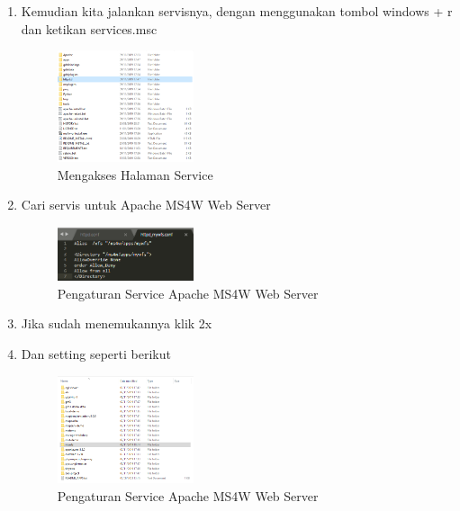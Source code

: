 \begin{enumerate}
  \item Kemudian kita jalankan servisnya, dengan menggunakan tombol windows + r dan ketikan services.msc
  \hfill\break
    \begin{figure}[H]
		\includegraphics[width=4cm]{figures/1174015/4/No7.png}
		\centering
		\caption{Mengakses Halaman Service}
    \end{figure}

  \item Cari servis untuk Apache MS4W Web Server
    \begin{figure}[H]
		\includegraphics[width=4cm]{figures/1174015/4/No8.png}
		\centering
		\caption{Pengaturan Service Apache MS4W Web Server}
    \end{figure}

  \item Jika sudah menemukannya klik 2x
  \item Dan setting seperti berikut
  \hfill\break
    \begin{figure}[H]
		\includegraphics[width=4cm]{figures/1174015/4/No9.png}
		\centering
		\caption{Pengaturan Service Apache MS4W Web Server}
    \end{figure}

\end{enumerate}


